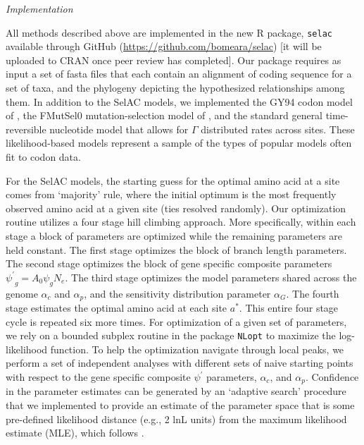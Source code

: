 \documentclass[12pt,letterpaper]{article}
\renewcommand{\subsection}[1]{%
\bigskip
\begin{center}
\begin{large}
\normalfont\itshape #1
\end{large}
\end{center}}
\newcommand{\Ne}{\ensuremath{{N_e}}\xspace} %
\newcommand{\selac}{SelAC\xspace}
\newcommand{\alphac}{\ensuremath{\alpha_c}\xspace}
\newcommand{\alphag}{\ensuremath{\alpha_G}\xspace}
\newcommand{\alphap}{\ensuremath{\alpha_p}\xspace}
\newcommand{\aopt}{\ensuremath{a^*}\xspace}
\newcommand{\psiprime}{\ensuremath{\psi^\prime}\xspace}
\begin{document}
\subsection{Implementation}\label{sec:implementation}
All methods described above are implemented in the new R package, \texttt{selac} available through GitHub (\url{https://github.com/bomeara/selac}) [it will be uploaded to CRAN once peer review has completed].
Our package requires as input a set of fasta files that each contain an alignment of coding sequence for a set of taxa, and the phylogeny depicting the hypothesized relationships among them.
In addition to the SelAC models, we implemented the GY94 codon model of \citet{GoldmanAndYang1994}, the FMutSel0 mutation-selection model of \citet{YangAndNielsen2008}, and the standard general time-reversible nucleotide model that allows for $\Gamma$ distributed rates across sites.
These likelihood-based models represent a sample of the types of popular models often fit to codon data.

For the \selac models, the starting guess for the optimal amino acid at a site comes from `majority' rule, where the initial optimum is the most frequently observed amino acid at a given site (ties resolved randomly).
Our optimization routine utilizes a four stage hill climbing approach.
More specifically, within each stage a block of parameters are optimized while the remaining parameters are held constant.
The first stage optimizes the block of branch length parameters.
The second stage optimizes the block of gene specific composite parameters $ \psiprime_g = A_0 \psi_g \Ne$.
The third stage optimizes the model parameters shared across the genome $\alphac$ and $\alphap$, and the sensitivity distribution parameter $\alphag$.
The fourth stage estimates the optimal amino acid at each site \aopt.
This entire four stage cycle is repeated six more times.
For optimization of a given set of parameters, we rely on a bounded subplex routine \citep{Rowan1990} in the package \texttt{NLopt} \citep{Johnson2012} to maximize the log-likelihood function.
To help the optimization navigate through local peaks, we perform a set of independent analyses with different sets of naive starting points with respect to the gene specific composite $\psiprime$ parameters, $\alphac$, and $\alphap$.
Confidence in the parameter estimates can be generated by an `adaptive search' procedure that we implemented to provide an estimate of the parameter space that is some pre-defined likelihood distance (e.g., 2 lnL units) from the maximum likelihood estimate (MLE), which follows  \citet{BeaulieuAndOMeara2016,edwards1984likelihood}.
\end{document}
